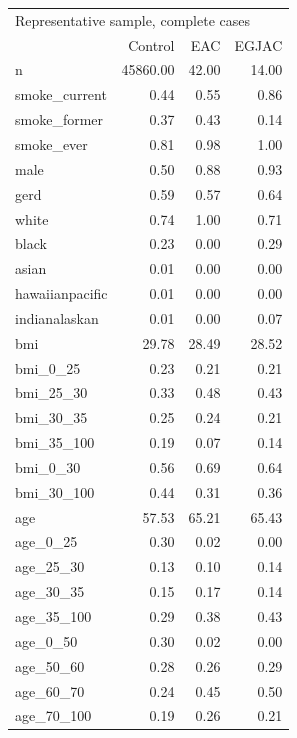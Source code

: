 \documentclass[12pt]{article}
\begin{document}
\begin{minipage}{0.50\linewidth}\scriptsize
\begin{tabular}{lrrr}
  \toprule
  \multicolumn{4}{l}{Representative sample, complete cases} \\
 & Control & EAC & EGJAC \\ 
  \midrule
n & 45860.00 & 42.00 & 14.00 \\ 
  smoke\_current & 0.44 & 0.55 & 0.86 \\ 
  smoke\_former & 0.37 & 0.43 & 0.14 \\ 
  smoke\_ever & 0.81 & 0.98 & 1.00 \\ 
  male & 0.50 & 0.88 & 0.93 \\ 
  gerd & 0.59 & 0.57 & 0.64 \\ 
  white & 0.74 & 1.00 & 0.71 \\ 
  black & 0.23 & 0.00 & 0.29 \\ 
  asian & 0.01 & 0.00 & 0.00 \\ 
  hawaiianpacific & 0.01 & 0.00 & 0.00 \\ 
  indianalaskan & 0.01 & 0.00 & 0.07 \\ 
  bmi & 29.78 & 28.49 & 28.52 \\ 
  bmi\_0\_25 & 0.23 & 0.21 & 0.21 \\ 
  bmi\_25\_30 & 0.33 & 0.48 & 0.43 \\ 
  bmi\_30\_35 & 0.25 & 0.24 & 0.21 \\ 
  bmi\_35\_100 & 0.19 & 0.07 & 0.14 \\ 
  bmi\_0\_30 & 0.56 & 0.69 & 0.64 \\ 
  bmi\_30\_100 & 0.44 & 0.31 & 0.36 \\ 
  age & 57.53 & 65.21 & 65.43 \\ 
  age\_0\_25 & 0.30 & 0.02 & 0.00 \\ 
  age\_25\_30 & 0.13 & 0.10 & 0.14 \\ 
  age\_30\_35 & 0.15 & 0.17 & 0.14 \\ 
  age\_35\_100 & 0.29 & 0.38 & 0.43 \\ 
  age\_0\_50 & 0.30 & 0.02 & 0.00 \\ 
  age\_50\_60 & 0.28 & 0.26 & 0.29 \\ 
  age\_60\_70 & 0.24 & 0.45 & 0.50 \\ 
  age\_70\_100 & 0.19 & 0.26 & 0.21 \\ 
   \bottomrule
\end{tabular}
\end{minipage}
\end{document}
